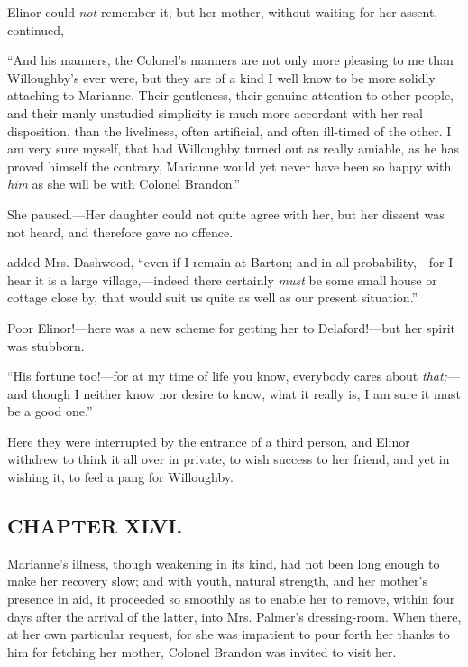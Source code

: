 Elinor could {\em not} remember it; but her mother, without waiting for her assent, continued,

“And his manners, the Colonel's manners are not only more pleasing to me than Willoughby's ever were, but they are of a kind I well know to be more solidly attaching to Marianne. Their gentleness, their genuine attention to other people, and their manly unstudied simplicity is much more accordant with her real disposition, than the liveliness, often artificial, and often ill-timed of the other. I am very sure myself, that had Willoughby turned out as really amiable, as he has proved himself the contrary, Marianne would yet never have been so happy with {\em him} as she will be with Colonel Brandon.”

She paused.---Her daughter could not quite agree with her, but her dissent was not heard, and therefore gave no offence.

 added Mrs. Dashwood, “even if I remain at Barton; and in all probability,---for I hear it is a large village,---indeed there certainly {\em must} be some small house or cottage close by, that would suit us quite as well as our present situation.”

Poor Elinor!---here was a new scheme for getting her to Delaford!---but her spirit was stubborn.

“His fortune too!---for at my time of life you know, everybody cares about {\em that;}---and though I neither know nor desire to know, what it really is, I am sure it must be a good one.”

Here they were interrupted by the entrance of a third person, and Elinor withdrew to think it all over in private, to wish success to her friend, and yet in wishing it, to feel a pang for Willoughby.

\subsection[chapter-xlvi.]{\useURL[url46][][][]\from[url46]CHAPTER XLVI.}

Marianne's illness, though weakening in its kind, had not been long enough to make her recovery slow; and with youth, natural strength, and her mother's presence in aid, it proceeded so smoothly as to enable her to remove, within four days after the arrival of the latter, into Mrs. Palmer's dressing-room. When there, at her own particular request, for she was impatient to pour forth her thanks to him for fetching her mother, Colonel Brandon was invited to visit her.

